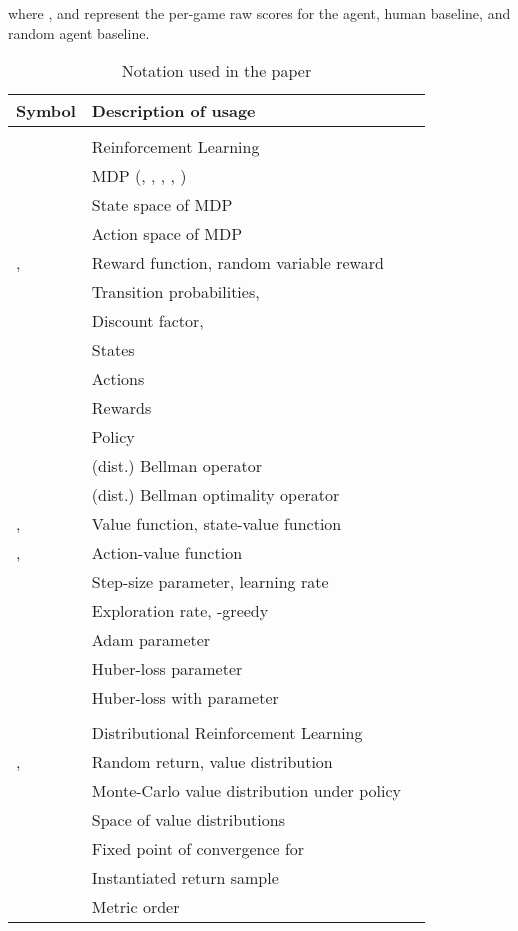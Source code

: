 \documentclass[letterpaper]{article}
\begin{document}
where ,  and  represent the per-game raw scores for the agent, human baseline, and random agent baseline.

\begin{table}[ht]
\centering
\caption{Notation used in the paper}
\label{my-label}
\begin{tabular}{lll}
  Symbol        &  Description of usage\\
  \hline \\
                & Reinforcement Learning \\
  \hline
           &  MDP (, , , , ) \\
           &  State space of MDP \\
           &  Action space of MDP \\
  ,     &  Reward function, random variable reward \\
             &  Transition probabilities,  \\
        &  Discount factor,  \\
   & States \\
   & Actions \\
      &   Rewards\\
           & Policy \\
       & (dist.) Bellman operator \\
           & (dist.) Bellman optimality operator \\
  ,   & Value function, state-value function \\
  ,   & Action-value function \\
        & Step-size parameter, learning rate \\
      & Exploration rate, -greedy \\
   & Adam parameter \\
        & Huber-loss parameter  \\
    & Huber-loss with parameter  \\
  \hline \\
                & Distributional Reinforcement Learning \\
  \hline
  ,   & Random return, value distribution \\
    & Monte-Carlo value distribution under policy  \\
           & Space of value distributions \\
   & Fixed point of convergence for  \\
      & Instantiated return sample \\
             & Metric order \\

\end{tabular}
\end{table}
\end{document}
